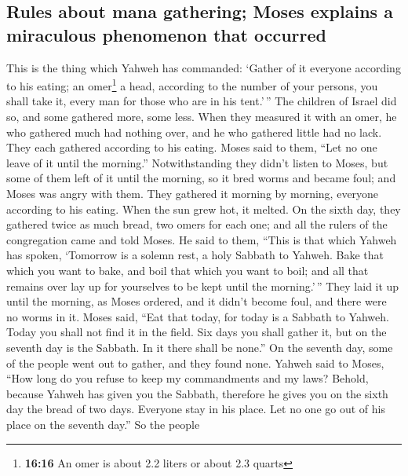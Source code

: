 \hypertarget{rules-about-mana-gathering-moses-explains-a-miraculous-phenomenon-that-occurred}{%
\subsection{Rules about mana gathering; Moses explains a miraculous
phenomenon that
occurred}\label{rules-about-mana-gathering-moses-explains-a-miraculous-phenomenon-that-occurred}}

 This is the thing which Yahweh has commanded: `Gather of
it everyone according to his eating; an omer\footnote{\textbf{16:16} An
  omer is about 2.2 liters or about 2.3 quarts} a head, according to the
number of your persons, you shall take it, every man for those who are
in his tent.'\,''  The children of Israel did so, and
some gathered more, some less.  When they measured it
with an omer, he who gathered much had nothing over, and he who gathered
little had no lack. They each gathered according to his eating.
 Moses said to them, ``Let no one leave of it until the
morning.''  Notwithstanding they didn't listen to Moses,
but some of them left of it until the morning, so it bred worms and
became foul; and Moses was angry with them.  They
gathered it morning by morning, everyone according to his eating. When
the sun grew hot, it melted.  On the sixth day, they
gathered twice as much bread, two omers for each one; and all the rulers
of the congregation came and told Moses.  He said to
them, ``This is that which Yahweh has spoken, `Tomorrow is a solemn
rest, a holy Sabbath to Yahweh. Bake that which you want to bake, and
boil that which you want to boil; and all that remains over lay up for
yourselves to be kept until the morning.'\,''  They laid
it up until the morning, as Moses ordered, and it didn't become foul,
and there were no worms in it.  Moses said, ``Eat that
today, for today is a Sabbath to Yahweh. Today you shall not find it in
the field.  Six days you shall gather it, but on the
seventh day is the Sabbath. In it there shall be none.'' 
On the seventh day, some of the people went out to gather, and they
found none.  Yahweh said to Moses, ``How long do you
refuse to keep my commandments and my laws?  Behold,
because Yahweh has given you the Sabbath, therefore he gives you on the
sixth day the bread of two days. Everyone stay in his place. Let no one
go out of his place on the seventh day.''  So the people
